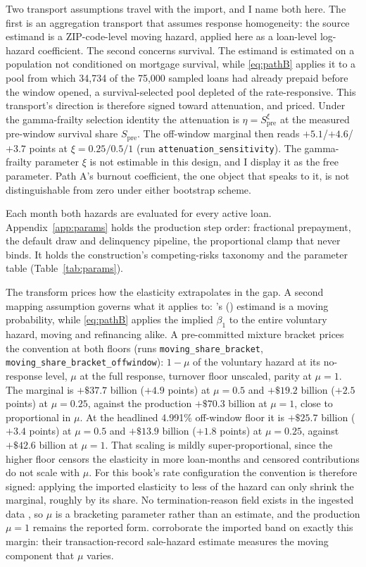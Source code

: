 \documentclass[12pt]{article}
\newcommand{\citepos}[1]{\citeauthor{#1}'s (\citeyear{#1})}
\begin{document}
Two transport assumptions travel with the import, and I name both here. The first is an aggregation transport that assumes response homogeneity: the source estimand is a ZIP-code-level moving hazard, applied here as a loan-level log-hazard coefficient. The second concerns survival. The estimand is estimated on a population not conditioned on mortgage survival, while \eqref{eq:pathB} applies it to a pool from which 34,734 of the 75,000 sampled loans had already prepaid before the window opened, a survival-selected pool depleted of the rate-responsive. This transport's direction is therefore signed toward attenuation, and priced. Under the gamma-frailty selection identity the attenuation is $\eta = S_{\mathrm{pre}}^{\xi}$ at the measured pre-window survival share $S_{\mathrm{pre}}$. The off-window marginal then reads $+5.1$/$+4.6$/$+3.7$ points at $\xi = 0.25/0.5/1$ (run \texttt{attenuation\_sensitivity}). The gamma-frailty parameter $\xi$ is not estimable in this design, and I display it as the free parameter. Path A's burnout coefficient, the one object that speaks to it, is not distinguishable from zero under either bootstrap scheme.

Each month both hazards are evaluated for every active loan. Appendix~\ref{app:params} holds the production step order: fractional prepayment, the default draw and delinquency pipeline, the proportional clamp that never binds. It holds the construction's competing-risks taxonomy and the parameter table (Table~\ref{tab:params}).

The transform prices how the elasticity extrapolates in the gap. A second mapping assumption governs what it applies to: \citepos{liebersohn2024} estimand is a moving probability, while \eqref{eq:pathB} applies the implied $\beta_1$ to the entire voluntary hazard, moving and refinancing alike. A pre-committed mixture bracket prices the convention at both floors (runs \texttt{moving\_share\_bracket}, \texttt{moving\_share\_bracket\_offwindow}): $1-\mu$ of the voluntary hazard at its no-response level, $\mu$ at the full response, turnover floor unscaled, parity at $\mu = 1$. The marginal is $+\$37.7$ billion ($+4.9$ points) at $\mu = 0.5$ and $+\$19.2$ billion ($+2.5$ points) at $\mu = 0.25$, against the production $+\$70.3$ billion at $\mu = 1$, close to proportional in $\mu$. At the headlined 4.991\% off-window floor it is $+\$25.7$ billion ($+3.4$ points) at $\mu = 0.5$ and $+\$13.9$ billion ($+1.8$ points) at $\mu = 0.25$, against $+\$42.6$ billion at $\mu = 1$. That scaling is mildly super-proportional, since the higher floor censors the elasticity in more loan-months and censored contributions do not scale with $\mu$. For this book's rate configuration the convention is therefore signed: applying the imported elasticity to less of the hazard can only shrink the marginal, roughly by its share. No termination-reason field exists in the ingested data \citep[cf.][on the refinancing-versus-moving mix]{amromin2020}, so $\mu$ is a bracketing parameter rather than an estimate, and the production $\mu = 1$ remains the reported form. \citet{graybill2026} corroborate the imported band on exactly this margin: their transaction-record sale-hazard estimate measures the moving component that $\mu$ varies.
\end{document}
